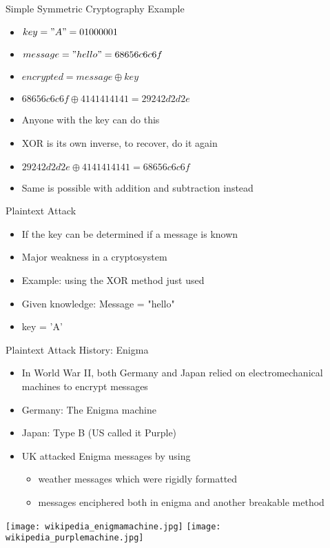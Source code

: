 \begin{withoutheadline}
\begin{frame}{Simple Symmetric Cryptography Example}
\begin{itemize}
    \item $key = "A" = 01000001$
    \item $message = "hello" = 68 65 6c 6c 6f$ 
    \item $encrypted = message \oplus key$
    \item $68 65 6c 6c 6f \oplus 41 41 41 41 41 = 29 24 2d 2d 2e$
    \item Anyone with the key can do this
    \item XOR is its own inverse, to recover, do it again
    \item $29 24 2d 2d 2e \oplus 41 41 41 41 41 = 68 65 6c 6c 6f$
    \item Same is possible with addition and subtraction instead 
\end{itemize}
\end{frame}

\begin{frame}{Plaintext Attack}
\begin{itemize}
    \item If the key can be determined if a message is known
    \item Major weakness in a cryptosystem
    \item Example: using the XOR method just used
    \item Given knowledge: Message = "hello"
    \item key = 'A'
\end{itemize}
\end{frame}

\begin{frame}{Plaintext Attack History: Enigma}
\begin{itemize}
    \item In World War II, both Germany and Japan relied on electromechanical machines to encrypt messages
    \item Germany: The Enigma machine
    \item Japan: Type B (US called it Purple)
    \item UK attacked Enigma messages by using
    \begin{itemize} 
        \item weather messages which were rigidly formatted
        \item messages enciphered both in enigma and another breakable method
    \end{itemize}
\end{itemize}
\texttt{[image: wikipedia\_enigmamachine.jpg]}
\texttt{[image: wikipedia\_purplemachine.jpg]}
\end{frame}


\end{withoutheadline}
